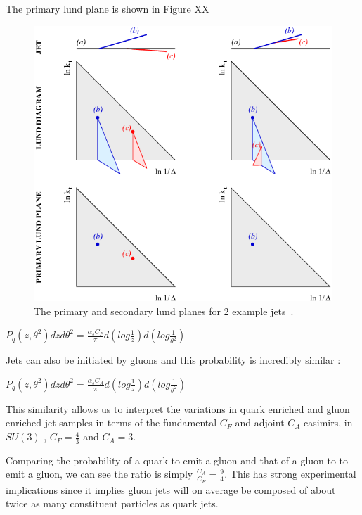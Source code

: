 The primary lund plane is shown in Figure XX ~\cite{Dreyer:2018nbf}

\begin{figure}[htb]
\centering
\includegraphics[width=1.0\textwidth]{visuals/figs_lund.png}
\caption{The primary and secondary lund planes for 2 example jets~\cite{Dreyer:2018nbf}.}
\label{fig:lund}
\end{figure}


$P_q(z,\theta^2) dz d \theta^2 = \frac{\alpha_s C_F}{\pi} d( log\frac{1}{z}  ) d(log \frac{1}{ \theta^2})  $\newline

Jets can also be initiated by gluons and this probability is incredibly similar :


$P_q(z,\theta^2) dz d \theta^2 = \frac{\alpha_s C_A}{\pi} d( log\frac{1}{z}  ) d(log \frac{1}{ \theta^2})  $\newline


This similarity allows us to interpret the variations in quark enriched and gluon enriched jet samples in terms of the fundamental $C_F$ and adjoint $C_A$ casimirs, in $SU(3)$ ,   $C_F = \frac{4}{3}$ and $C_A=3$. 


Comparing the probability of a quark to emit a gluon and that of a gluon to to emit a gluon, we can see the ratio is simply $\frac{C_A}{C_F} =\frac{9}{4} $. This has strong experimental implications since it implies gluon jets will on average be composed of about twice as many constituent particles as quark jets.

